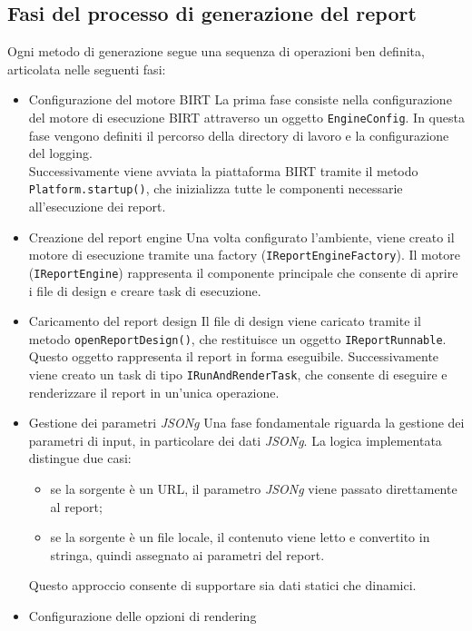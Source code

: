 \subsection{Fasi del processo di generazione del report}

Ogni metodo di generazione segue una sequenza di operazioni ben definita, articolata nelle seguenti fasi:

\begin{itemize}
    \item {Configurazione del motore BIRT}
    La prima fase consiste nella configurazione del motore di esecuzione BIRT attraverso un oggetto \texttt{EngineConfig}. In questa fase vengono definiti il percorso della directory di lavoro e la configurazione del logging.\\
    Successivamente viene avviata la piattaforma BIRT tramite il metodo \texttt{Platform.startup()}, che inizializza tutte le componenti necessarie all'esecuzione dei report.
    \item {Creazione del report engine}
    Una volta configurato l'ambiente, viene creato il motore di esecuzione tramite una factory (\texttt{IReportEngineFactory}). Il motore (\texttt{IReportEngine}) rappresenta il componente principale che consente di aprire i file di design e creare task di esecuzione.
    \item {Caricamento del report design}
    Il file di design viene caricato tramite il metodo \texttt{openReportDesign()}, che restituisce un oggetto \texttt{IReportRunnable}. Questo oggetto rappresenta il report in forma eseguibile.
    Successivamente viene creato un task di tipo \texttt{IRunAndRenderTask}, che consente di eseguire e renderizzare il report in un'unica operazione.
    \item{Gestione dei parametri \emph{\gls{JSONg}}}
    Una fase fondamentale riguarda la gestione dei parametri di input, in particolare dei dati \emph{\gls{JSONg}}.
    La logica implementata distingue due casi:
    \begin{itemize}
        \item se la sorgente è un URL, il parametro \emph{\gls{JSONg}} viene passato direttamente al report;
        \item se la sorgente è un file locale, il contenuto viene letto e convertito in stringa, quindi assegnato ai parametri del report.
    \end{itemize}
    Questo approccio consente di supportare sia dati statici che dinamici.
    \item{Configurazione delle opzioni di rendering}

\end{itemize}
